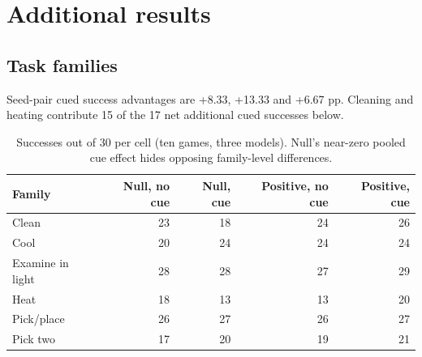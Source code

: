 \documentclass[10pt,letterpaper]{article}
\begin{document}
\section{Additional results}\label{app:families}
\subsection{Task families}
Seed-pair cued success advantages are +8.33, +13.33 and +6.67 pp. Cleaning and heating contribute 15 of the 17 net additional cued successes below.
\begin{table}[H]
\centering\small
\caption{Successes out of 30 per cell (ten games, three models). Null's near-zero pooled cue effect hides opposing family-level differences.}
\begin{tabular}{lrrrr}\toprule
Family & Null, no cue & Null, cue & Positive, no cue & Positive, cue\\\midrule
Clean & 23 & 18 & 24 & 26\\
Cool & 20 & 24 & 24 & 24\\
Examine in light & 28 & 28 & 27 & 29\\
Heat & 18 & 13 & 13 & 20\\
Pick/place & 26 & 27 & 26 & 27\\
Pick two & 17 & 20 & 19 & 21\\\bottomrule
\end{tabular}
\end{table}
\end{document}
